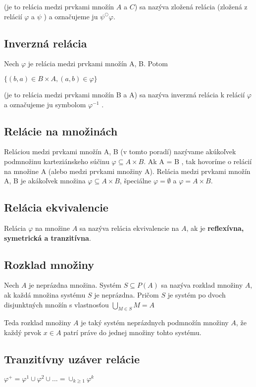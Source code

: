 		(je to relácia medzi prvkami množín $A$ a $C$) sa nazýva zložená relácia (zložená z relácií $\varphi$ a $\psi$ ) a označujeme ju $\psi^{\bigcirc} \varphi$.

 	\subsection{Inverzná relácia}

		Nech $\varphi$ je relácia medzi prvkami množín A, B. Potom

		$\{( b, a ) \in B \times A, ( a, b ) \in \varphi \} $

		(je to relácia medzi prvkami množín B a A) sa nazýva inverzná relácia k relácií $\varphi$ a označujeme ju symbolom $\varphi^{-1}$ .

	\subsection{Relácie na množinách} 
		Reláciou medzi prvkami množín A, B (v tomto poradí) nazývame akúkoľvek podmnožinu karteziánskeho súčinu $\varphi \subseteq A \times B$. Ak A = B , tak hovoríme o relácií na množine A (alebo medzi prvkami množiny A). Relácia medzi prvkami množín A, B je akákoľvek množina $\varphi \subseteq A \times B $, špeciálne $\varphi = \emptyset$ a $\varphi = A \times B$.
	\subsection{Relácia ekvivalencie}
		Relácia $\varphi$ na množine $A$ sa nazýva relácia ekvivalencie na $A$, ak je \textbf{reflexívna, symetrická a tranzitívna}.

	\subsection{Rozklad množiny}

		Nech $A$ je neprázdna množina. Systém $S \subseteq P (A)$ sa nazýva rozklad množiny $A$, ak každá množina systému $S$ je neprázdna. Pričom $S$ je systém po dvoch disjunktných množín s vlastnosťou $\bigcup_{M \in S} M = A$

		Teda rozklad množiny $A$ je taký systém neprázdnych podmnožín množiny $A$, že každý prvok
		$x \in A$ patrí práve do jednej množiny tohto systému.

	\subsection{Tranzitívny uzáver relácie}
		$\varphi^{+} = \varphi^{1} \cup \varphi^{2} \cup ... = \cup_{k \geq 1} \varphi^k$


